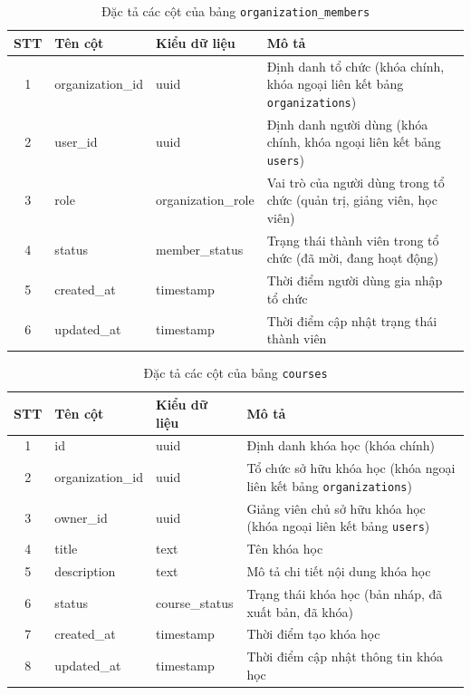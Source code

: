\documentclass[../DoAn.tex]{subfiles}
\begin{document}
\begin{table}[H]
\centering
\small
\renewcommand{\arraystretch}{1.3}
\begin{tabular}{|c|l|l|p{6.2cm}|}
\hline
\textbf{STT} & \textbf{Tên cột} & \textbf{Kiểu dữ liệu} & \textbf{Mô tả} \\ \hline
1 & organization\_id & uuid & Định danh tổ chức (khóa chính, khóa ngoại liên kết bảng \texttt{organizations}) \\ \hline
2 & user\_id & uuid & Định danh người dùng (khóa chính, khóa ngoại liên kết bảng \texttt{users}) \\ \hline
3 & role & organization\_role & Vai trò của người dùng trong tổ chức (quản trị, giảng viên, học viên) \\ \hline
4 & status & member\_status & Trạng thái thành viên trong tổ chức (đã mời, đang hoạt động) \\ \hline
5 & created\_at & timestamp & Thời điểm người dùng gia nhập tổ chức \\ \hline
6 & updated\_at & timestamp & Thời điểm cập nhật trạng thái thành viên \\ \hline
\end{tabular}
\caption{Đặc tả các cột của bảng \texttt{organization\_members}}
\label{tbl:organization_members}
\end{table}

\begin{table}[H]
\centering
\small
\renewcommand{\arraystretch}{1.3}
\begin{tabular}{|c|l|l|p{6.2cm}|}
\hline
\textbf{STT} & \textbf{Tên cột} & \textbf{Kiểu dữ liệu} & \textbf{Mô tả} \\ \hline
1 & id & uuid & Định danh khóa học (khóa chính) \\ \hline
2 & organization\_id & uuid & Tổ chức sở hữu khóa học (khóa ngoại liên kết bảng \texttt{organizations}) \\ \hline
3 & owner\_id & uuid & Giảng viên chủ sở hữu khóa học (khóa ngoại liên kết bảng \texttt{users}) \\ \hline
4 & title & text & Tên khóa học \\ \hline
5 & description & text & Mô tả chi tiết nội dung khóa học \\ \hline
6 & status & course\_status & Trạng thái khóa học (bản nháp, đã xuất bản, đã khóa) \\ \hline
7 & created\_at & timestamp & Thời điểm tạo khóa học \\ \hline
8 & updated\_at & timestamp & Thời điểm cập nhật thông tin khóa học \\ \hline
\end{tabular}
\caption{Đặc tả các cột của bảng \texttt{courses}}
\label{tbl:courses}
\end{table}
\end{document}

